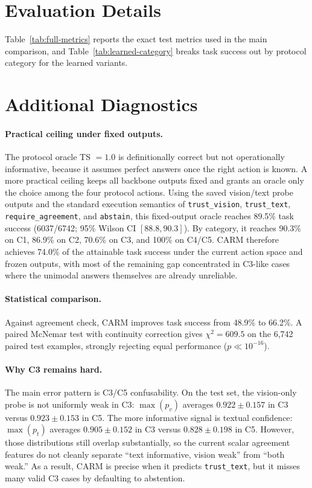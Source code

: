 \documentclass[11pt]{article}
\begin{document}
\section{Evaluation Details}
\label{app:eval-details}

Table~\ref{tab:full-metrics} reports the exact test metrics used in the main comparison,
and Table~\ref{tab:learned-category} breaks task success out by protocol category for the
learned variants.






\section{Additional Diagnostics}
\label{app:analysis}

\paragraph{Practical ceiling under fixed outputs.}
The protocol oracle TS $= 1.0$ is definitionally correct but not operationally informative,
because it assumes perfect answers once the right action is known. A more practical ceiling
keeps all backbone outputs fixed and grants an oracle only the choice among the four
protocol actions. Using the saved vision/text probe outputs and the standard execution
semantics of \texttt{trust\_vision}, \texttt{trust\_text},
\texttt{require\_agreement}, and \texttt{abstain}, this fixed-output oracle reaches
89.5\% task success (6037/6742; 95\% Wilson CI $[88.8, 90.3]$). By category, it reaches
90.3\% on C1, 86.9\% on C2, 70.6\% on C3, and 100\% on C4/C5. CARM therefore achieves
74.0\% of the attainable task success under the current action space and frozen outputs,
with most of the remaining gap concentrated in C3-like cases where the unimodal answers
themselves are already unreliable.

\paragraph{Statistical comparison.}
Against agreement check, CARM improves task success from 48.9\% to 66.2\%. A paired
McNemar test with continuity correction gives $\chi^2=609.5$ on the 6,742 paired test
examples, strongly rejecting equal performance ($p \ll 10^{-16}$).

\paragraph{Why C3 remains hard.}
The main error pattern is C3/C5 confusability. On the test set, the vision-only probe is
not uniformly weak in C3: $\max(p_v)$ averages $0.922 \pm 0.157$ in C3 versus
$0.923 \pm 0.153$ in C5. The more informative signal is textual confidence:
$\max(p_t)$ averages $0.905 \pm 0.152$ in C3 versus $0.828 \pm 0.198$ in C5. However,
those distributions still overlap substantially, so the current scalar agreement features do
not cleanly separate ``text informative, vision weak'' from ``both weak.'' As a result,
CARM is precise when it predicts \texttt{trust\_text}, but it misses many valid C3 cases by
defaulting to abstention.
\end{document}
